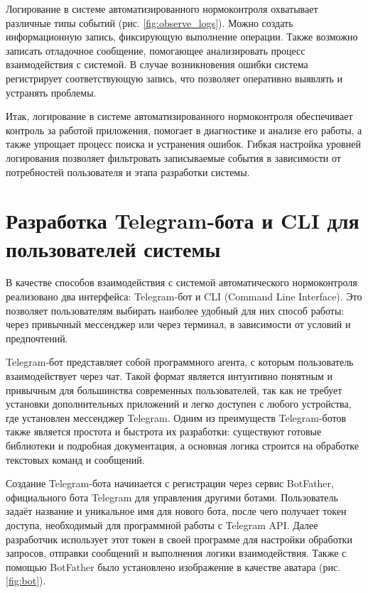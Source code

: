 \documentclass{report}
\begin{document}

Логирование в системе автоматизированного нормоконтроля охватывает различные типы событий (рис. \ref{fig:observe_logs}). Можно создать информационную запись, фиксирующую выполнение операции. Также возможно записать отладочное сообщение, помогающее анализировать процесс взаимодействия с системой. В случае возникновения ошибки система регистрирует соответствующую запись, что позволяет оперативно выявлять и устранять проблемы.


Итак, логирование в системе автоматизированного нормоконтроля обеспечивает контроль за работой приложения, помогает в диагностике и анализе его работы, а также упрощает процесс поиска и устранения ошибок. Гибкая настройка уровней логирования позволяет фильтровать записываемые события в зависимости от потребностей пользователя и этапа разработки системы.

\section{Разработка Telegram-бота и CLI для пользователей системы}

В качестве способов взаимодействия с системой автоматического нормоконтроля реализовано два интерфейса: Telegram-бот и CLI (Command Line Interface). Это позволяет пользователям выбирать наиболее удобный для них способ работы: через привычный мессенджер или через терминал, в зависимости от условий и предпочтений.

Telegram-бот представляет собой программного агента, с которым пользователь взаимодействует через чат. Такой формат является интуитивно понятным и привычным для большинства современных пользователей, так как не требует установки дополнительных приложений и легко доступен с любого устройства, где установлен мессенджер Telegram. Одним из преимуществ Telegram-ботов также является простота и быстрота их разработки: существуют готовые библиотеки и подробная документация, а основная логика строится на обработке текстовых команд и сообщений.

Создание Telegram-бота начинается с регистрации через сервис BotFather, официального бота Telegram для управления другими ботами. Пользователь задаёт название и уникальное имя для нового бота, после чего получает токен доступа, необходимый для программной работы с Telegram API. Далее разработчик использует этот токен в своей программе для настройки обработки запросов, отправки сообщений и выполнения логики взаимодействия. Также с помощью BotFather было установлено изображение в качестве \break аватара (рис. \ref{fig:bot}).
\end{document}
